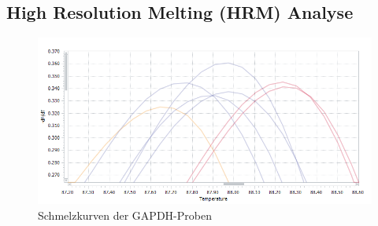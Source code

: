 \documentclass{article}
\begin{document}
\subsection*{High Resolution Melting (HRM) Analyse}
\begin{figure}[H]
    \centering
    \includegraphics[width=\textwidth]{images/cycler/mc2.png}
    \caption{Schmelzkurven der GAPDH-Proben}
    \label{fig:gapdh}
\end{figure}
\end{document}
